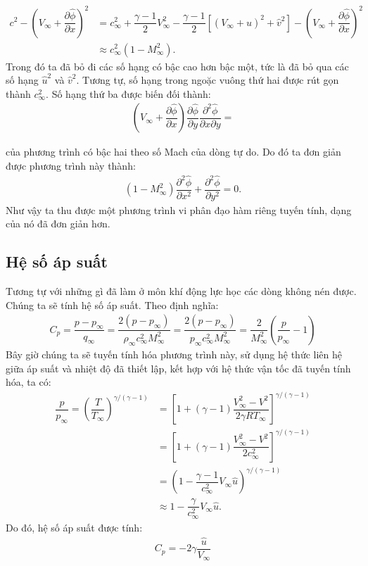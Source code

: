 \documentclass[../../DONG_CHAY_NEN_DUOC.tex]{subfiles}
\begin{document}
		\[
			\begin{aligned}
				c^2-\left(V_\infty+\dfrac{\partial\widehat{\phi}}{\partial x}\right)^2&=c_\infty^2+\dfrac{\gamma-1}{2}V_\infty^2-\dfrac{\gamma-1}{2}\left[\left(V_\infty+\widehat{u}\right)^2+ \widehat{v}^2\right]-\left(V_\infty+\dfrac{\partial\widehat{\phi}}{\partial x}\right)^2\\
				&\approx c_\infty^2\left(1-M_\infty^2\right).
			\end{aligned}
		\]
	Trong đó ta đã bỏ đi các số hạng có bậc cao hơn bậc một, tức là đã bỏ qua các số hạng $\widehat{u}^2$ và $\widehat{v}^2$. Tương tự, số hạng trong ngoặc vuông thứ hai được rút gọn thành $c_\infty^2$. Số hạng thứ ba được biến đối thành:
		\[
			\begin{aligned}
				\left(V_\infty+\dfrac{\partial\widehat{\phi}}{\partial x}\right)\dfrac{\partial\widehat{\phi}}{\partial y}\dfrac{\partial^2\widehat{\phi}}{\partial x\partial y}=
			\end{aligned}
		\]


	của phương trình có bậc hai theo số Mach của dòng tự do. Do đó ta đơn giản được phương trình này thành:
		\begin{align}
			\boxed{
				\left(1-M_\infty^2\right)\dfrac{\partial^2\widehat{\phi}}{\partial x^2}+\dfrac{\partial^2\widehat{\phi}}{\partial y^2}=0
				}.
		\end{align}
	Như vậy ta thu được một phương trình vi phân đạo hàm riêng tuyến tính, dạng của nó đã đơn giản hơn.
\subsection{Hệ số áp suất}
	Tương tự với những gì đã làm ở môn khí động lực học các dòng không nén được. Chúng ta sẽ tính hệ số áp suất. Theo định nghĩa:
		\begin{align}
			\boxed{C_p=}\dfrac{p-p_\infty}{q_\infty}=\dfrac{2(p-p_\infty)}{\rho_\infty c_\infty^2M_\infty^2}=\dfrac{2(p-p_\infty)}{p_\infty c_\infty^2M_\infty^2}=\boxed{\dfrac{2}{M_\infty^2}\left(\dfrac{p}{p_\infty}-1\right)}
		\end{align}
	Bây giờ chúng ta sẽ tuyến tính hóa phương trình này, sử dụng hệ thức liên hệ giữa áp suất và nhiệt độ đã thiết lập, kết hợp với hệ thức vận tốc đã tuyến tính hóa, ta có:
		\[
			\begin{aligned}
				\dfrac{p}{p_\infty}=\left(\dfrac{T}{T_\infty}\right)^{\gamma/(\gamma-1)}&=\left[1+(\gamma-1)\dfrac{V_\infty^2-V^2}{2\gamma RT_\infty}\right]^{\gamma/(\gamma-1)}\\
				&=\left[1+(\gamma-1)\dfrac{V_\infty^2-V^2}{2c_\infty^2}\right]^{\gamma/(\gamma-1)}\\
				&=\left(1-\dfrac{\gamma-1}{c_\infty^2}V_\infty\widehat{u}\right)^{\gamma/(\gamma-1)}\\
				&\approx 1-\dfrac{\gamma}{c_\infty^2}V_\infty\widehat{u}.
			\end{aligned}
		\]
	Do đó, hệ số áp suất được tính:
		\begin{align}
			C_p=-2\gamma\dfrac{\widehat{u}}{V_\infty}
		\end{align}
\end{document}
